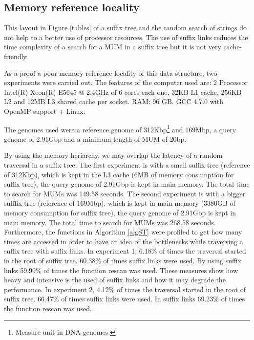 \documentclass[conference]{IEEEtran}
\begin{document}
\subsection{Memory reference locality}
This layout in Figure \ref{tables} of a suffix tree and the random search of strings do not help to a better use of processor resources. The use of suffix links reduces the time complexity of a search for a MUM in a suffix tree but it is not very cache-friendly.

As a proof a poor memory reference locality of this data structure, two experiments were carried out. The features of the computer used are: 2 Processor Intel(R) Xeon(R) E5645 @ 2.4GHz of 6 cores each one, 32KB L1 cache, 256KB L2 and 12MB L3 shared cache per socket. RAM: 96 GB. GCC 4.7.0 with OpenMP support + Linux.

The genomes used were a reference genome of 312Kbp\footnote{Measure unit in DNA genomes.} and 169Mbp, a query genome of 2.91Gbp and a minimum length of MUM of 20bp.

By using the memory heriarchy, we may overlap the latency of a random traversal in a suffix tree. The first experiment is with a small suffix tree (reference of 312Kbp), which is kept in the L3 cache (6MB of memory consumption for suffix tree), the query genome of 2.91Gbp is kept in main memory. The total time to search for MUMs was 149.58 seconds. The second experiment is with a bigger sufffix tree (reference of 169Mbp), which is kept in main memory (3380GB of memory consumption for suffix tree), the query genome of 2.91Gbp is kept in main memory. The total time to search for MUMs was 268.58 seconds. Furthermore, the functions in Algorithm \ref{algST} were profiled to get how many times are accessed in order to have an idea of the bottlenecks while traversing a suffix tree with suffix links. In experiment 1, 6.18\% of times the traversal started in the root of suffix tree. 60.38\% of times suffix links were used. By using suffix links 59.99\% of times the function rescan was used. These measures show how heavy and intensive is the used of suffix links and how it may degrade the performance. In experiment 2, 4.12\% of times the traversal started in the root of suffix tree. 66.47\% of times suffix links were used. In suffix links 69.23\% of times the function rescan was used.
 
\end{document}
